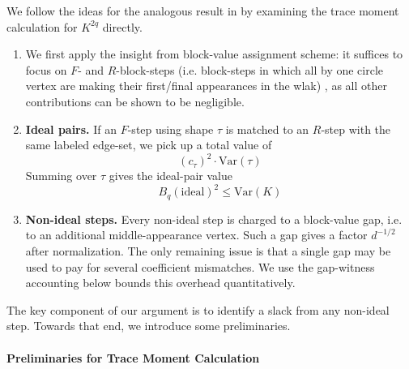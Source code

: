 \documentclass[12pt]{article}
\newcommand{\Var}{\mathrm{Var}}
\begin{document}
We follow the ideas for the analogous result in \cite{PX25} by examining the trace moment calculation for $K^{2q}$ directly. \begin{enumerate}
	\item  We first apply the insight from block-value assignment scheme: it suffices to focus on $F$- and $R$-block-steps (i.e. block-steps in which all by one circle vertex are making their first/final appearances in the wlak) , as all other contributions can be shown to be negligible.

    \item \textbf{Ideal pairs.}
If an \(F\)-step using shape \(\tau\) is matched to an \(R\)-step with the same labeled
edge-set, we pick up a total value of 
\[
   (c_\tau)^2 \cdot  \Var(\tau) 
\]
Summing over \(\tau\) gives the ideal-pair value
\[
    B_q(\text{ideal})^2 \le \Var (K)
\]

    \item \textbf{Non-ideal steps.}
Every non-ideal step is charged to a block-value gap, i.e. to an additional
middle-appearance vertex.  Such a gap gives a factor \(d^{-1/2}\) after normalization.
The only remaining issue is that a single gap may be used to pay for several coefficient
mismatches. We use the gap-witness accounting below bounds this overhead quantitatively. 

\end{enumerate}


The key component of our argument is to identify a slack from any non-ideal step. Towards that end, we introduce some preliminaries.

\paragraph{Preliminaries for Trace Moment Calculation}
\end{document}
